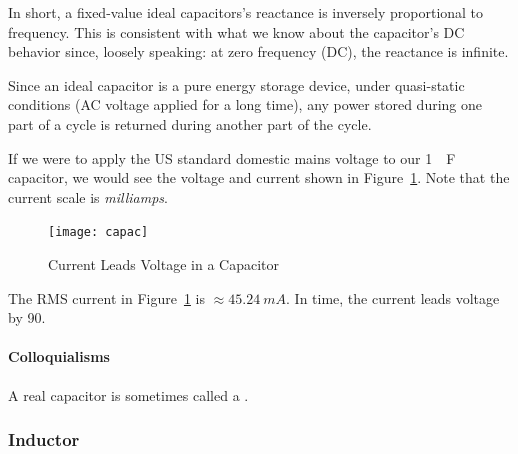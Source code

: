 \documentclass[11pt]{article}
\newcommand*\gC{1~\unit{\mu F}\xspace}
\newcommand*\giCm{45.24~\unit{mA}\xspace}
\begin{document}
In short, a fixed-value ideal capacitors's reactance is inversely
proportional to frequency. This is consistent with what we know about
the capacitor's DC behavior since, loosely speaking: at zero frequency
(DC), the reactance is infinite.

Since an ideal capacitor is a pure energy storage device, under
quasi-static conditions (AC voltage applied for a long time), any
power stored during one part of a cycle is returned during another
part of the cycle.

If we were to apply the US standard domestic mains voltage to our
\gC capacitor, we would see the voltage and current shown
in Figure~\ref{fig:capac}. Note that the current scale is
\emph{milliamps}.

\begin{figure}
  \centering
  \texttt{[image: capac]}
  \caption{Current Leads Voltage in a Capacitor}
  \label{fig:capac}
\end{figure}

The RMS current in Figure~\ref{fig:capac} is
$\approx\giCm$. In time, the current leads voltage by 90\deg.


\paragraph{Colloquialisms}

A real capacitor is sometimes called a .


\subsubsection{Inductor}
\end{document}
